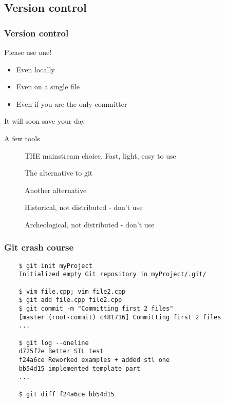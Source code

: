 \subsection[VCS]{Version control}

\begin{frame}[fragile]
  \frametitle{Version control}
  \begin{alertblock}{Please use one!}
    \begin{itemize}
    \item Even locally
    \item Even on a single file
    \item Even if you are the only committer
    \end{itemize}
    It will soon save your day
  \end{alertblock}
  \begin{block}{A few tools}
    \begin{description}
    \item[\href{http://git-scm.com/}{}]
      THE mainstream choice. Fast, light, easy to use
    \item[\href{http://mercurial.selenic.com/}{}]
      The alternative to git
    \item[\href{http://bazaar.canonical.com/en/}{}]
      Another alternative
    \item[\href{https://subversion.apache.org/}{}]
      Historical, not distributed - don't use
    \item[\href{https://cvs.nongnu.org/}{}]
      Archeological, not distributed - don't use
    \end{description}
  \end{block}
\end{frame}

\begin{frame}[fragile]
  \frametitle{Git crash course}
  \begin{verbatim}
    $ git init myProject
    Initialized empty Git repository in myProject/.git/

    $ vim file.cpp; vim file2.cpp
    $ git add file.cpp file2.cpp
    $ git commit -m "Committing first 2 files"
    [master (root-commit) c481716] Committing first 2 files
    ...

    $ git log --oneline
    d725f2e Better STL test
    f24a6ce Reworked examples + added stl one
    bb54d15 implemented template part
    ...

    $ git diff f24a6ce bb54d15
  \end{verbatim}
\end{frame}
